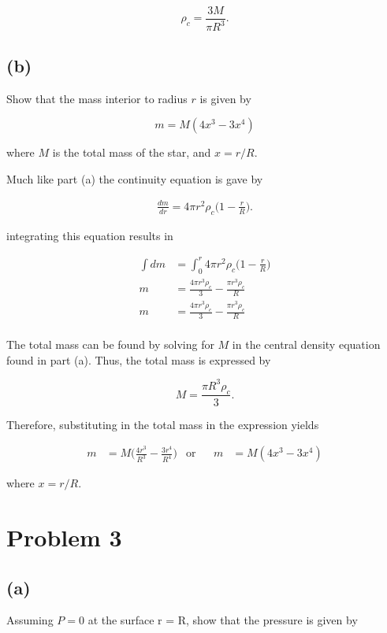 \documentclass[11pt]{article}
\begin{document}
$$
\rho_{c} = \frac{3M}{\pi R^{3}}.
$$

\subsection*{(b)}

Show that the mass interior to radius $r$ is given by

$$
m = M(4x^{3} - 3x^{4})
$$

where $M$ is the total mass of the star, and $x = r/R$.

Much like part (a) the continuity equation is gave by 

\begin{align*}
\frac{dm}{dr} = 4\pi r^{2} \rho_{c}\Bigg(1 - \frac{r}{R}\Bigg).
\end{align*}

integrating this equation results in

\begin{align*}
\int dm &= \int_{0}^{r} 4\pi r^{2} \rho_{c}\Bigg(1 - \frac{r}{R}\Bigg) \\
m &= \frac{4\pi r^{3} \rho_{c}}{3} - \frac{\pi r^{3} \rho_{c}}{R} \\
m &= \frac{4\pi r^{3} \rho_{c}}{3} - \frac{\pi r^{3} \rho_{c}}{R} \\
\end{align*}

The total mass can be found by solving for $M$ in the central density equation found in part (a). Thus, the total mass is expressed by

$$
M = \frac{\pi R^{3} \rho_{c}}{3}.
$$

Therefore, substituting in the total mass in the expression yields

\begin{align*}
m &= M\Bigg(\frac{4r^{3}}{R^{3}} - \frac{3r^{4}}{R^{4}} \Bigg) & \text{or} && m &= M(4x^{3} - 3x^{4})
\end{align*}

where $x = r/R$.

\clearpage
\section*{Problem 3}

\subsection*{(a)}

Assuming $P = 0$ at the surface r = R, show that the pressure is given by
\end{document}

